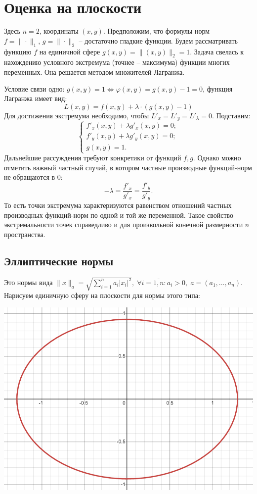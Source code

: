\documentclass{article}
\begin{document}
\newpage
\section{Оценка на плоскости} \label{3}

Здесь $n=2$, координаты $(x,y)$. Предположим, что формулы норм $f = \|{\cdot}\|_1, \, g = \|{\cdot}\|_2$ -- достаточно гладкие функции. Будем рассматривать функцию $f$ на единичной сфере $g(x,y) = \|(x,y)\|_2 = 1$. Задача свелась к нахождению условного экстремума (точнее -- максимума) функции многих переменных. Она решается методом множителей Лагранжа.

Условие связи одно: $g(x,y) = 1 \Leftrightarrow \varphi(x,y) = g(x,y) - 1 = 0$, функция Лагранжа имеет вид:
$$ L(x,y) = f(x,y) + \lambda \cdot (g(x,y) - 1) $$
Для достижения экстремума необходимо, чтобы $L'_x = L'_y = L'_{\lambda} = 0$. Подставим:
\begin{equation}\label{eq:l2}
	\begin{cases}
		f'_x(x,y)+\lambda g'_x(x,y) = 0; \\
		f'_y(x,y)+\lambda g'_y(x,y) = 0; \\
		g(x,y) = 1.
	\end{cases}
\end{equation}
Дальнейшие рассуждения требуют конкретики от функций $f, g$. Однако можно отметить важный частный случай, в котором частные производные функций-норм не обращаются в 0:
$$ -\lambda = \frac{f'_x}{g'_x} = \frac{f'_y}{g'_y}. $$
То есть точки экстремума характеризуются равенством отношений частных производных функций-норм по одной и той же переменной. Такое свойство экстремальности точек справедливо и для произвольной конечной размерности $n$ пространства.
\subsection{Эллиптические нормы}
Это нормы вида $\|x\|_a = \sqrt{\sum\limits_{i=1}^n a_i|x_i|^2}, \; \forall{i=\overline{1,n}}: a_i > 0, \; a = (a_1,\ldots,a_n)$. Нарисуем единичную сферу на плоскости для нормы этого типа:

\begin{center}
\includegraphics[scale=0.6]{ellipse.png} 
\end{center}
\end{document}
